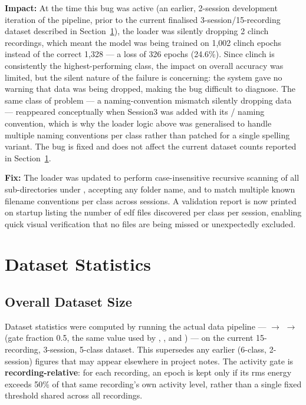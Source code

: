 \textbf{Impact:} At the time this bug was active (an earlier,
2-session development iteration of the pipeline, prior to the
current finalised 3-session/15-recording dataset described in
Section~\ref{sec:dc_stats}), the loader was silently dropping 2
clinch recordings, which meant the model was being trained on
1{,}002 clinch epochs instead of the correct 1{,}328 --- a loss
of 326 epochs (24.6\%). Since clinch is consistently the
highest-performing class, the impact on overall accuracy was
limited, but the silent nature of the failure is concerning: the
system gave no warning that data was being dropped, making the
bug difficult to diagnose. The same class of problem --- a
naming-convention mismatch silently dropping data --- reappeared
conceptually when Session3 was added with its  /
 naming convention, which is why the loader logic
above was generalised to handle multiple naming conventions per
class rather than patched for a single spelling variant. The bug
is fixed and does not affect the current dataset counts reported
in Section~\ref{sec:dc_stats}.

\textbf{Fix:} The loader was updated to perform
case-insensitive recursive scanning of all sub-directories under
, accepting any folder name, and to match multiple
known filename conventions per class across sessions. A
validation report is now printed on startup listing the number
of \acrshort{edf} files discovered per class per session,
enabling quick visual verification that no files are being
missed or unexpectedly excluded.

\section{Dataset Statistics}
\label{sec:dc_stats}

\subsection{Overall Dataset Size}

Dataset statistics were computed by running the actual data
pipeline ---  $\rightarrow$
 $\rightarrow$
 (gate fraction 0.5, the same
value used by ,
, and ) --- on
the current 15-recording, 3-session, 5-class dataset. This
supersedes any earlier (6-class, 2-session) figures that may
appear elsewhere in project notes. The activity gate is
\textbf{recording-relative}: for each recording, an epoch is
kept only if its \acrshort{rms} energy exceeds 50\% of that
same recording's own activity level, rather than a single fixed
threshold shared across all recordings.

